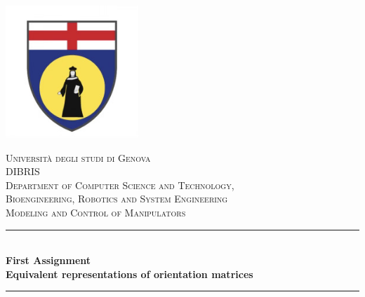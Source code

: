 \begin{titlepage}

\newcommand{\HRule}{\rule{\linewidth}{0.5mm}} %

\center
\includegraphics[width=5cm]{Title/Unige-logo.jpeg}\\[1cm] %
 

\center %


\textsc{\Huge Università degli studi di Genova}\\[1cm] %
\textsc{\LARGE DIBRIS}\\[0.3cm]
\textsc{Department of Computer Science and Technology,}\\
\textsc{Bioengineering, Robotics and System Engineering}\\[1cm] %
\textsc{\LARGE{Modeling and Control of Manipulators}}\\[1cm] %

\makeatletter
\HRule \\[0.4cm]
{ \huge \bfseries First Assignment}\\[0.2cm] 
{\Large \bfseries Equivalent representations of orientation matrices}\\
\HRule \\[1.5cm]
 

\end{titlepage}
